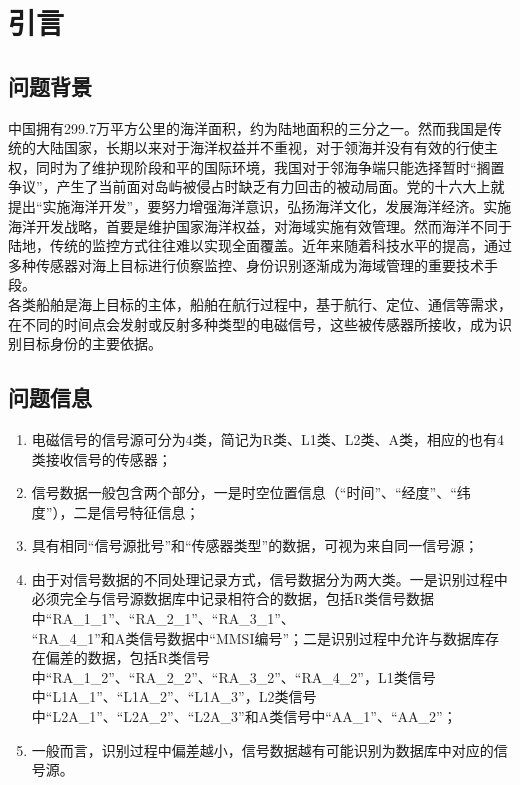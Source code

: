 \clearpage
\setcounter{section}{-1}
\section{引言}
\subsection{问题背景}
中国拥有299.7万平方公里的海洋面积，约为陆地面积的三分之一。然而我国是传统的大陆国家，长期以来对于海洋权益并不重视，对于领海并没有有效的行使主权，同时为了维护现阶段和平的国际环境，我国对于邻海争端只能选择暂时“搁置争议”，产生了当前面对岛屿被侵占时缺乏有力回击的被动局面。党的十六大上就提出“实施海洋开发”，要努力增强海洋意识，弘扬海洋文化，发展海洋经济。实施海洋开发战略，首要是维护国家海洋权益，对海域实施有效管理。然而海洋不同于陆地，传统的监控方式往往难以实现全面覆盖。近年来随着科技水平的提高，通过多种传感器对海上目标进行侦察监控、身份识别逐渐成为海域管理的重要技术手段。
\\\indent 各类船舶是海上目标的主体，船舶在航行过程中，基于航行、定位、通信等需求，在不同的时间点会发射或反射多种类型的电磁信号，这些被传感器所接收，成为识别目标身份的主要依据。
\subsection{问题信息}
\begin{enumerate}
	\item 电磁信号的信号源可分为4类，简记为R类、L1类、L2类、A类，相应的也有4类接收信号的传感器；
	\item 信号数据一般包含两个部分，一是时空位置信息（“时间”、“经度”、“纬度”），二是信号特征信息；
	\item 具有相同“信号源批号”和“传感器类型”的数据，可视为来自同一信号源；
	\item 由于对信号数据的不同处理记录方式，信号数据分为两大类。一是识别过程中必须完全与信号源数据库中记录相符合的数据，包括R类信号数据中“RA\_1\_1”、“RA\_2\_1”、“RA\_3\_1”、\\“RA\_4\_1”和A类信号数据中“MMSI编号”；二是识别过程中允许与数据库存在偏差的数据，包括R类信号中“RA\_1\_2”、“RA\_2\_2”、“RA\_3\_2”、“RA\_4\_2”，L1类信号中“L1A\_1”、“L1A\_2”、“L1A\_3”，L2类信号中“L2A\_1”、“L2A\_2”、“L2A\_3”和A类信号中“AA\_1”、“AA\_2”；
	\item 一般而言，识别过程中偏差越小，信号数据越有可能识别为数据库中对应的信号源。
\end{enumerate}
